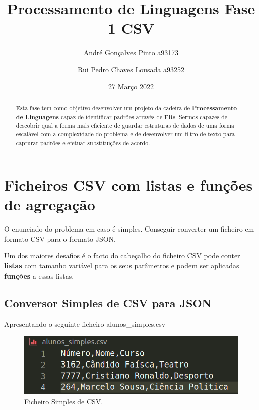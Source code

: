 \documentclass[runningheads]{llncs}
\begin{document}
\title{Processamento de Linguagens Fase 1 CSV}

\author{André Gonçalves Pinto a93173 \and
Rui Pedro Chaves Lousada a93252}
%
\date{27 Março  2022}
\maketitle          
\begin{abstract}{
Esta fase tem como objetivo desenvolver um projeto da cadeira de \textbf{Processamento de Linguagens} capaz de identificar padrões através de ERs.
Sermos capazes de descobrir qual a forma mais eficiente de guardar estruturas de dados de uma forma escalável com a complexidade do problema e de desenvolver um filtro de texto para capturar padrões e efetuar substituições de acordo.}
\end{abstract}

\newpage

\section{Ficheiros CSV com listas e funções de agregação}

O enunciado do problema em caso é simples. Conseguir converter um ficheiro em formato CSV para o formato JSON.


Um dos maiores desafios é o facto do cabeçalho do ficheiro CSV pode conter \textbf{listas} com tamanho variável para os seus parâmetros e podem ser aplicadas \textbf{funções} a essas listas.

\subsection{Conversor Simples de CSV para JSON}
Apresentando o seguinte ficheiro alunos\_simples.csv
\begin{figure}[h]
\centering
\includegraphics[width=\textwidth]{pl01.png}
\caption{Ficheiro Simples de CSV.} \label{fig1}
\end{figure}
\end{document}

